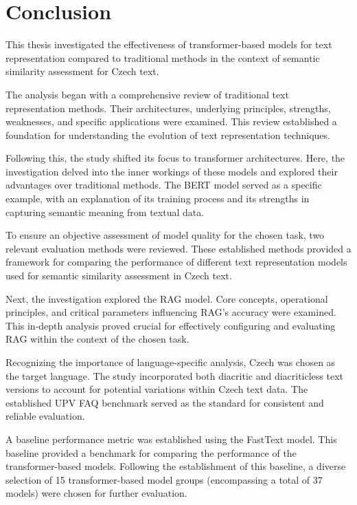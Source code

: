 
\chapter{Conclusion \label{chap:conclusion}}

This thesis investigated the effectiveness of transformer-based models for text representation compared to traditional methods in the context of semantic similarity assessment for Czech text.

The analysis began with a comprehensive review of traditional text representation methods.
Their architectures, underlying principles, strengths, weaknesses, and specific applications were examined.
This review established a foundation for understanding the evolution of text representation techniques.

Following this, the study shifted its focus to transformer architectures.
Here, the investigation delved into the inner workings of these models and explored their advantages over traditional methods.
The \ac{BERT} model served as a specific example, with an explanation of its training process and its strengths in capturing semantic meaning from textual data.

To ensure an objective assessment of model quality for the chosen task, two relevant evaluation methods were reviewed.
These established methods provided a framework for comparing the performance of different text representation models used for semantic similarity assessment in Czech text.

Next, the investigation explored the \ac{RAG} model.
Core concepts, operational principles, and critical parameters influencing \ac{RAG}'s accuracy were examined.
This in-depth analysis proved crucial for effectively configuring and evaluating \ac{RAG} within the context of the chosen task.

Recognizing the importance of language-specific analysis, Czech was chosen as the target language.
The study incorporated both diacritic and diacriticless text versions to account for potential variations within Czech text data.
The established UPV FAQ benchmark served as the standard for consistent and reliable evaluation.

A baseline performance metric was established using the FastText model.
This baseline provided a benchmark for comparing the performance of the transformer-based models.
Following the establishment of this baseline, a diverse selection of 15 transformer-based model groups (encompassing a total of 37 models) were chosen for further evaluation.

